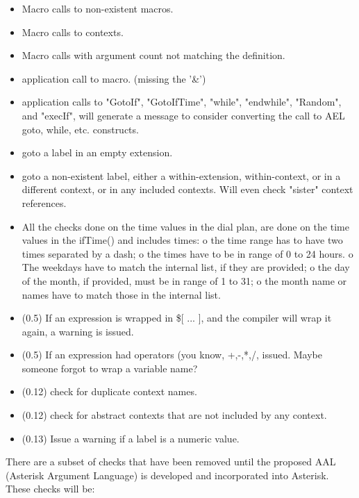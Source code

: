 {\begin{itemize}
    \item Macro calls to non-existent macros.
    \item Macro calls to contexts.
    \item Macro calls with argument count not matching the definition.
    \item application call to macro. (missing the '\&')
    \item application calls to "GotoIf", "GotoIfTime", "while",
      "endwhile", "Random", and "execIf", will generate a message to
      consider converting the call to AEL goto, while, etc. constructs.
    \item goto a label in an empty extension.
    \item goto a non-existent label, either a within-extension,
      within-context, or in a different context, or in any included
      contexts. Will even check "sister" context references.
    \item All the checks done on the time values in the dial plan, are
      done on the time values in the ifTime() and includes times:
          o the time range has to have two times separated by a dash;
          o the times have to be in range of 0 to 24 hours.
          o The weekdays have to match the internal list, if they are provided;
          o the day of the month, if provided, must be in range of 1 to 31;
          o the month name or names have to match those in the internal list. 
    \item (0.5) If an expression is wrapped in \$[ ... ], and the compiler
      will wrap it again, a warning is issued.
    \item (0.5) If an expression had operators (you know,
      +,-,*,/,%
      issued. Maybe someone forgot to wrap a variable name?
    \item (0.12) check for duplicate context names.
    \item (0.12) check for abstract contexts that are not included by any context.
    \item (0.13) Issue a warning if a label is a numeric value. 
\end{itemize}

There are a subset of checks that have been removed until the proposed
AAL (Asterisk Argument Language) is developed and incorporated into Asterisk.
These checks will be:

}
